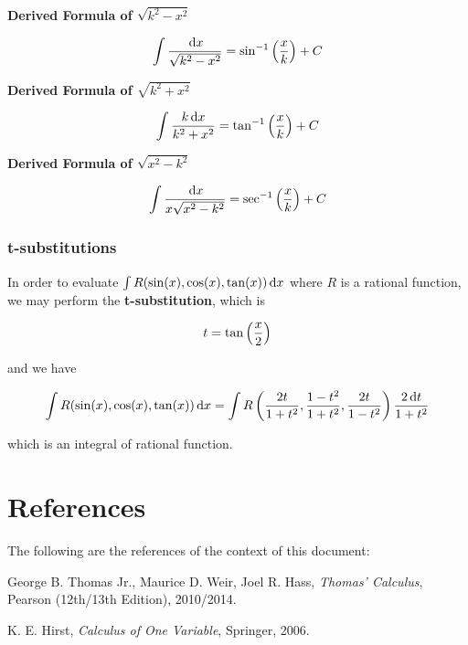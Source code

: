 \documentclass[a4paper,12pt]{article}
\begin{document}
\begin{alist}
  \item \textbf{Derived Formula of $\sqrt{k^{2}-x^{2}}$}

  $$\int\frac{\,\mathrm{d} x}{\sqrt{k^{2}-x^{2}}}=\sin^{-1}\left( \frac{x}{k}\right)+C$$

  \item \textbf{Derived Formula of $\sqrt{k^{2}+x^{2}}$}

  $$\int\frac{k\,\mathrm{d} x}{k^{2}+x^{2}}=\tan^{-1}\left( \frac{x}{k}\right)+C$$

  \item \textbf{Derived Formula of $\sqrt{x^{2}-k^{2}}$}

  $$\int\frac{\,\mathrm{d} x}{x\sqrt{x^{2}-k^{2}}}=\sec^{-1}\left( \frac{x}{k}\right)+C$$
\end{alist}

\subsubsection{t-substitutions}
In order to evaluate $\int R(\sin(x),\cos(x),\tan(x))\,\mathrm{d} x$ where $R$ is a rational function, we may perform the \textbf{t-substitution}, which is

$$t=\tan\left( \frac{x}{2}\right)$$\s

and we have

$$\int R(\sin(x),\cos(x),\tan(x))\,\mathrm{d} x=\int R\left( \frac{2t}{1+t^{2}},\frac{1-t^{2}}{1+t^{2}},\frac{2t}{1-t^{2}}\right)\frac{2\,\mathrm{d} t}{1+t^{2}}$$\s

which is an integral of rational function.

\pagebreak

\section*{References}
The following are the references of the context of this document:

\begin{alist}
  \item George B. Thomas Jr., Maurice D. Weir, Joel R. Hass, \textit{Thomas' Calculus}, Pearson (12th/13th Edition), 2010/2014.
  \item K. E. Hirst, \textit{Calculus of One Variable}, Springer, 2006.
\end{alist}

\pagebreak
\end{document}
